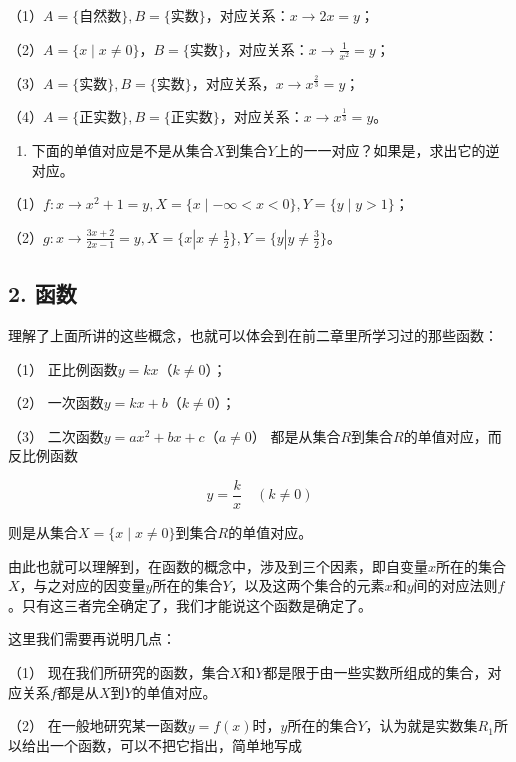 （1）\(A = \{\text{自然数}\}, B = \{\text{实数}\}\)，对应关系：\(x \to 2x = y\)；

（2）\(A = \{x \mid x \neq 0\}\)，\(B = \{\text{实数}\}\)，对应关系：\(x \to \frac{1}{x^2} = y\)；

（3）\(A = \{\text{实数}\}, B = \{\text{实数}\}\)，对应关系，\(x \to x^{\frac{2}{3}} = y\)；

（4）\(A = \{\text{正实数}\}, B = \{\text{正实数}\}\)，对应关系：\(x \to x^{\frac{1}{3}} = y\)。

\begin{enumerate}[start=4]
\item
  下面的单值对应是不是从集合\(X\)到集合\(Y\)上的一一对应？如果是，求出它的逆对应。
\end{enumerate}

（1）\(f: x \to x^2 + 1 = y, X = \{x \mid -\infty < x < 0\}, Y = \{y \mid y > 1\}\)；

（2）\(g: x \to \frac{3x + 2}{2x - 1} = y, X = \{x | x \neq \frac{1}{2}\}, Y = \{y | y \neq \frac{3}{2}\}\)。

\subsection{2. 函数}

理解了上面所讲的这些概念，也就可以体会到在前二章里所学习过的那些函数：

（1） 正比例函数\(y = kx\)（\(k \neq 0\)）；

（2） 一次函数\(y = kx + b\)（\(k \neq 0\)）；

（3） 二次函数\(y = ax^2 + bx + c\)（\(a \neq 0\)）
都是从集合\(R\)到集合\(R\)的单值对应，而反比例函数

\[
y = \frac{k}{x} \quad (k \neq 0)
\]

则是从集合\(X = \{x \mid x \neq 0\}\)到集合\(R\)的单值对应。

由此也就可以理解到，在函数的概念中，涉及到三个因素，即自变量\(x\)所在的集合\(X\)，与之对应的因变量\(y\)所在的集合\(Y\)，以及这两个集合的元素\(x\)和\(y\)间的对应法则\(f\)。只有这三者完全确定了，我们才能说这个函数是确定了。

这里我们需要再说明几点：

（1）
现在我们所研究的函数，集合\(X\)和\(Y\)都是限于由一些实数所组成的集合，对应关系\(f\)都是从\(X\)到\(Y\)的单值对应。

（2）
在一般地研究某一函数\(y = f(x)\)时，\(y\)所在的集合\(Y\)，认为就是实数集\(R_1\)所以给出一个函数，可以不把它指出，简单地写成

